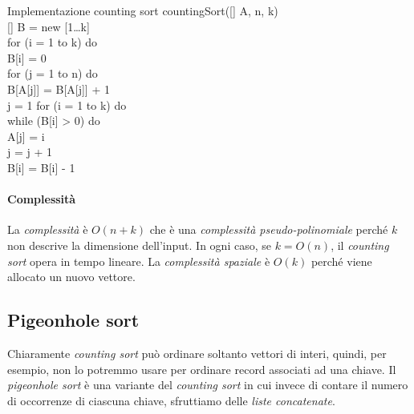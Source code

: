 \begin{minicode}{Implementazione counting sort}
\ind countingSort([] A,  n,  k)\\
    [] B = new [1\dots k]\\
    \indf for (i = 1 to k) do\\
        B[i] = 0\\
    \indf for (j = 1 to n) do\\
        B[A[j]] = B[A[j]] + 1\\
    \indf{} j = 1\hfill{}
    \indf for (i = 1 to k) do\\
        \indff while (B[i] > 0) do\\
            A[j] = i\\
            j = j + 1\\
            B[i] = B[i] - 1
\end{minicode}

\paragraph{Complessità}
La \emph{complessità} è $O(n+k)$ che è una \emph{complessità pseudo-polinomiale}
perché $k$ non descrive la dimensione dell'input. In ogni caso, se $k=O(n)$, il
\emph{counting sort} opera in tempo lineare. La \emph{complessità spaziale} è
$O(k)$ perché viene allocato un nuovo vettore.

\subsection{Pigeonhole sort}
Chiaramente \emph{counting sort} può ordinare soltanto vettori di interi, quindi,
per esempio, non lo potremmo usare per ordinare record associati ad una chiave.
Il \emph{pigeonhole sort} è una variante del \emph{counting sort} in cui invece
di contare il numero di occorrenze di ciascuna chiave, sfruttiamo delle
\emph{liste concatenate}.

